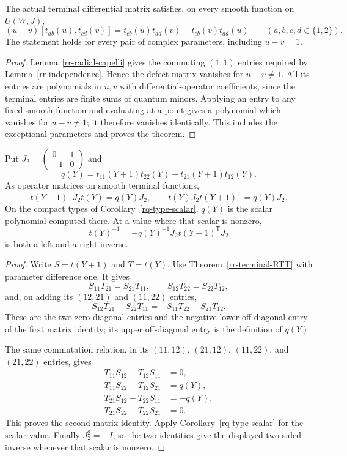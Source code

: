 \begin{theorem}\label{rr-terminal-RTT}
The actual terminal differential matrix satisfies,
on every smooth function on $U(W,J)$,
\[
 (u-v)[t_{ab}(u),t_{cd}(v)]
      =t_{cb}(u)t_{ad}(v)-t_{cb}(v)t_{ad}(u)
                \qquad(a,b,c,d\in\{1,2\}).
\]
The statement holds for every pair of complex
parameters, including $u-v=1$.
\end{theorem}

\begin{proof}
Lemma~\ref{rr-radial-capelli} gives the commuting
$(1,1)$ entries required by Lemma~\ref{rr-independence}.
Hence the defect matrix vanishes for $u-v\ne1$.
All its entries are polynomials in $u,v$ with
differential-operator coefficients, since the
terminal entries are finite sums of quantum minors.
Applying an entry to any fixed smooth function and
evaluating at a point gives a polynomial which
vanishes for $u-v\ne1$; it therefore vanishes
identically.  This includes the exceptional parameters
and proves the theorem.
\end{proof}

\begin{corollary}\label{rr-terminal-adjugate}
Put $J_2=\begin{pmatrix}0&1\\-1&0\end{pmatrix}$ and
\[
 q(Y)=t_{11}(Y+1)t_{22}(Y)-t_{21}(Y+1)t_{12}(Y).
\]
As operator matrices on smooth terminal functions,
\[
 t(Y+1)^{\mathsf T}J_2t(Y)=q(Y)J_2,\qquad
 t(Y)J_2t(Y+1)^{\mathsf T}=q(Y)J_2.
\]
On the compact types of Corollary~\ref{rq-type-scalar},
$q(Y)$ is the scalar polynomial computed there.
At a value where that scalar is nonzero,
\[
             t(Y)^{-1}=-q(Y)^{-1}
                              J_2t(Y+1)^{\mathsf T}J_2
\]
is both a left and a right inverse.
\end{corollary}

\begin{proof}
Write $S=t(Y+1)$ and $T=t(Y)$.
Use Theorem~\ref{rr-terminal-RTT} with parameter
difference one.  It gives
\[
 S_{11}T_{21}=S_{21}T_{11},\qquad
 S_{12}T_{22}=S_{22}T_{12},
\]
and, on adding its $(12,21)$ and $(11,22)$ entries,
\[
 S_{12}T_{21}-S_{22}T_{11}
                       =-S_{11}T_{22}+S_{21}T_{12}.
\]
These are the two zero diagonal entries and the
negative lower off-diagonal entry of the first
matrix identity; its upper off-diagonal entry
is the definition of $q(Y)$.

The same commutation relation, in its $(11,12)$,
$(21,12)$, $(11,22)$, and $(21,22)$ entries, gives
\begin{align*}
 T_{11}S_{12}-T_{12}S_{11}&=0,\\
 T_{11}S_{22}-T_{12}S_{21}&=q(Y),\\
 T_{21}S_{12}-T_{22}S_{11}&=-q(Y),\\
 T_{21}S_{22}-T_{22}S_{21}&=0.
\end{align*}
This proves the second matrix identity.
Apply Corollary~\ref{rq-type-scalar} for the scalar
value.  Finally $J_2^2=-I$, so the two identities
give the displayed two-sided inverse whenever
that scalar is nonzero.
\end{proof}

